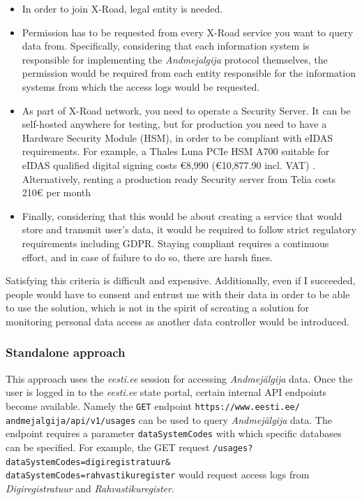 \begin{itemize}
    \item {In order to join X-Road, legal entity is needed.}
    \item {Permission has to be requested from every X-Road service you want to query data from. Specifically, considering that each information system is responsible for implementing the \textit{Andmejalgija} protocol themselves, the permission would be required from each entity responsible for the information systems from which the access logs would be requested.}
    \item {As part of X-Road network, you need to operate a Security Server. It can be self-hosted anywhere for testing, but for production you need to have a Hardware Security Module (HSM), in order to be compliant with eIDAS requirements. For example, a Thales Luna PCIe HSM A700 suitable for eIDAS qualified digital signing costs €8,990 (€10,877.90 incl. VAT) \cite{thales-luna-hsm-pricing}. Alternatively, renting a production ready Security server from Telia costs 210€ per month \cite{telia-xroad-server}}
    \item {Finally, considering that this would be about creating a service that would store and transmit user's data, it would be required to follow strict regulatory requirements including GDPR. Staying compliant requires a continuous effort, and in case of failure to do so, there are harsh fines.}
\end{itemize}

Satisfying this criteria is difficult and expensive. Additionally, even if I succeeded, people would have to consent and entrust me with their data in order to be able to use the solution, which is not in the spirit of screating a solution for monitoring personal data access as another data controller would be introduced.

\subsubsection{Standalone approach}
This approach uses the \textit{eesti.ee} session for accessing \textit{Andmejälgija} data. Once the user is logged in to the \textit{eesti.ee} state portal, certain internal API endpoints become available. Namely the \texttt{GET} endpoint \texttt{https://www.eesti.ee/\\andmejalgija/api/v1/usages} can be used to query \textit{Andmejälgija} data. The endpoint requires a parameter \texttt{dataSystemCodes} with which specific databases can be specified. For example, the GET request \texttt{/usages?dataSystemCodes=digiregistratuur\&\\dataSystemCodes=rahvastikuregister} would request access logs from \textit{Digiregistratuur} and \textit{Rahvastikuregister}.

